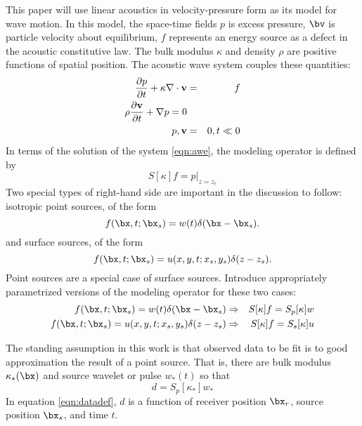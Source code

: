 This paper will use linear acoustics in velocity-pressure form as its
model for wave motion. In this model, the space-time fields $p$ is excess
pressure, $\bv$ is particle velocity about equilibrium, $f$
represents an energy source as a defect in the acoustic constitutive
law. The bulk modulus $\kappa$ and density $\rho$ are positive functions of
spatial position. The acoustic wave system couples these quantities:
\begin{eqnarray}
\label{eqn:awe}
\frac{\partial p}{\partial t} + \kappa \nabla \cdot {\bf v} &=&
                                                                f \nonumber\\
\rho \frac{\partial {\bf v}}{\partial t} + \nabla p = 0 \nonumber\\
p,{\bf v}&=&0, t \ll 0
\end{eqnarray}
In terms of the solution of the system \ref{eqn:awe}, the modeling
operator is defined by
\begin{equation}
\label{eqn:fwd}
S[\kappa]f = p|_{z=z_r}
\end{equation}
Two special types of right-hand side are important in the discussion
to follow: isotropic point sources, of the form
\begin{equation}
  \label{eqn:ipr}
  f(\bx,t;\bx_s) = w(t)\delta(\bx-\bx_s).  
\end{equation}
and surface sources, of the form
\begin{equation}
  \label{eqn:ss}
  f(\bx,t;\bx_s) = u(x,y,t;x_s,y_s)\delta(z-z_s). 
\end{equation}
Point sources are a special case of surface sources. Introduce appropriately
parametrized versions of the modeling operator for these two cases:
\begin{eqnarray}
 f(\bx,t;\bx_s) = w(t)\delta(\bx-\bx_s) & \Rightarrow & S[\kappa]f = S_p
  [\kappa]w\\ \nonumber
  \label{eqn:specsrc}
f(\bx,t;\bx_s) = u(x,y,t;x_s,y_s)\delta(z-z_s) & \Rightarrow & S[\kappa]f =
  S_s[\kappa]u
\end{eqnarray}

The standing assumption in this work is that observed data to be fit
is to good approximation the result of a point source. That is, there
are bulk modulus $\kappa_*(\bx)$ and source wavelet or pulse $w_*(t)$
so that
\begin{equation}
  \label{eqn:datadef}
  d = S_p[\kappa_*]w_*
\end{equation}
In equation \ref{eqn:datadef}, $d$ is a function of receiver position
$\bx_r$, source position $\bx_s$, and time $t$.

